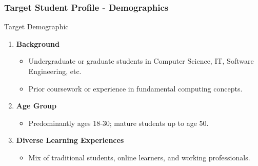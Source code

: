 \documentclass[aspectratio=169]{beamer}
\begin{document}
\begin{frame}[fragile]
    \frametitle{Target Student Profile - Demographics}
    \begin{block}{Target Demographic}
        \begin{enumerate}
            \item \textbf{Background}
            \begin{itemize}
                \item Undergraduate or graduate students in Computer Science, IT, Software Engineering, etc.
                \item Prior coursework or experience in fundamental computing concepts.
            \end{itemize}
            \item \textbf{Age Group}
            \begin{itemize}
                \item Predominantly ages 18-30; mature students up to age 50.
            \end{itemize}
            \item \textbf{Diverse Learning Experiences}
            \begin{itemize}
                \item Mix of traditional students, online learners, and working professionals.
            \end{itemize}
        \end{enumerate}
    \end{block}
\end{frame}
\end{document}
